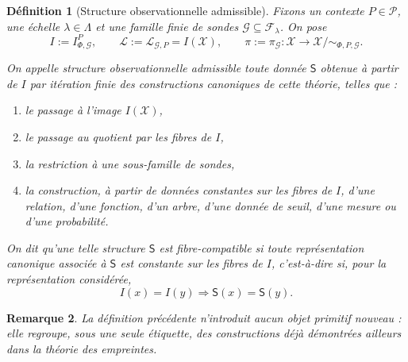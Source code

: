 \documentclass[11pt,a4paper,openany]{book}
\newtheorem{definition}{Définition}[chapter]
\newtheorem{remark}[definition]{Remarque}
\begin{document}
\begin{definition}[Structure observationnelle admissible]
Fixons un contexte \(P\in\mathcal P\), une échelle \(\lambda\in\Lambda\) et une famille finie de sondes \(\mathcal G\subseteq\mathcal F_\lambda\).
On pose
\[
I:=I_{\Phi,\mathcal G}^P,\qquad
\mathcal L:=\mathcal L_{\mathcal G,P}=I(\mathcal X),\qquad
\pi:=\pi_{\mathcal G}:\mathcal X\to\mathcal X/{\sim_{\Phi,P,\mathcal G}}.
\]

On appelle \emph{structure observationnelle admissible} toute donnée \(\mathsf S\) obtenue à partir de \(I\) par itération finie des constructions canoniques de cette théorie, telles que :
\begin{enumerate}[label=\textbf{(\arabic*)}]
\item le passage à l'image \(I(\mathcal X)\),
\item le passage au quotient par les fibres de \(I\),
\item la restriction à une sous-famille de sondes,
\item la construction, à partir de données constantes sur les fibres de \(I\), d'une relation, d'une fonction, d'un arbre, d'une donnée de seuil, d'une mesure ou d'une probabilité.
\end{enumerate}

On dit qu'une telle structure \(\mathsf S\) est \emph{fibre-compatible} si toute représentation canonique associée à \(\mathsf S\) est constante sur les fibres de \(I\), c'est-à-dire si, pour la représentation considérée,
\[
I(x)=I(y)\Longrightarrow \mathsf S(x)=\mathsf S(y).
\]
\end{definition}

\begin{remark}
La définition précédente n'introduit aucun objet primitif nouveau : elle regroupe, sous une seule étiquette, des constructions déjà démontrées ailleurs dans la théorie des empreintes.
\end{remark}
\end{document}
